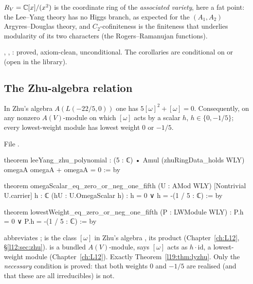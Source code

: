 \begin{physics}
$R_V = {\mathbb{C}}[x]/(x^2)$ is the coordinate ring of the \emph{associated variety}, here a fat point:
the Lee--Yang theory has no Higgs branch, as expected for the $(A_1,A_2)$ Argyres--Douglas theory, and
$C_2$-cofiniteness is the finiteness that underlies modularity of its two characters (the
Rogers--Ramanujan functions).
\end{physics}

\begin{status}
, , : proved,
axiom-clean, unconditional. The  corollaries are conditional on
 or  (open in the library).
\end{status}

\subsection{The Zhu-algebra relation}

\begin{theorem}\label{l19:thm:lyzhu}
In Zhu's algebra $A(L(-22/5,0))$ one has $5[\omega]^2+[\omega] = 0$. Consequently, on any nonzero
$A(V)$-module on which $[\omega]$ acts by a scalar $h$, $h\in\{0,-1/5\}$; every lowest-weight module has
lowest weight $0$ or $-1/5$.
\end{theorem}

\noindent File .
\begin{leancode}
theorem leeYang_zhu_polynomial :
    (5 : ℂ) • Amul (zhuRingData_holds WLY) omegaA omegaA + omegaA = 0 := by

theorem omegaScalar_eq_zero_or_neg_one_fifth (U : AMod WLY) [Nontrivial U.carrier]
    {h : ℂ} (hU : U.OmegaScalar h) : h = 0 ∨ h = -(1 / 5 : ℂ) := by

theorem lowestWeight_eq_zero_or_neg_one_fifth (P : LWModule WLY) :
    P.h = 0 ∨ P.h = -(1 / 5 : ℂ) := by
\end{leancode}

\begin{dictionary}
 abbreviates ;  is the class $[\omega]$ in Zhu's
algebra ,  its product (Chapter~\ref{ch:L12}, \S\ref{l12:sec:zhu}).
 is a bundled $A(V)$-module,  says $[\omega]$ acts as $h\cdot\mathrm{id}$,
 a lowest-weight module (Chapter~\ref{ch:L12}). Exactly Theorem~\ref{l19:thm:lyzhu}. Only
the \emph{necessary} condition is proved: that both weights $0$ and $-1/5$ are realised (and that these are all
irreducibles) is not.
\end{dictionary}

